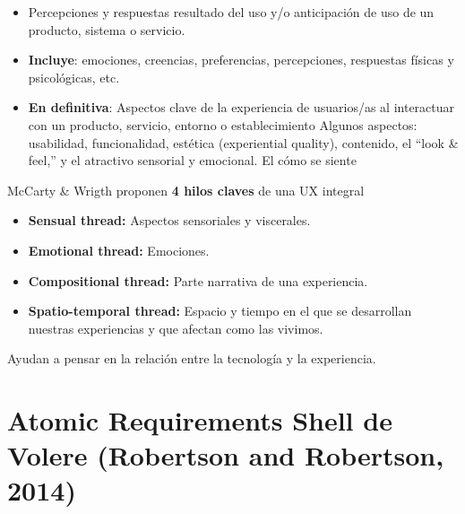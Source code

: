 \documentclass[12pt]{report} %
\begin{document}
\begin{itemize}

\item
  Percepciones y respuestas resultado del uso y/o anticipación de uso de
  un producto, sistema o servicio.
\item
\textbf{Incluye}: emociones, creencias, preferencias, percepciones, respuestas
  físicas y psicológicas, etc.
\item
\textbf{En definitiva}: Aspectos clave de la experiencia de usuarios/as al
  interactuar con un producto, servicio, entorno o establecimiento
  Algunos aspectos: usabilidad, funcionalidad, estética (experiential
  quality), contenido, el ``look \& feel,'' y el atractivo sensorial y
  emocional. El cómo se siente
\end{itemize}

McCarty \& Wrigth proponen \textbf{4 hilos claves} de una UX integral

\begin{itemize}

\item
\textbf{Sensual thread:} Aspectos sensoriales y viscerales.
\item
\textbf{Emotional thread:} Emociones.
\item
\textbf{Compositional thread:} Parte narrativa de una experiencia.
\item
\textbf{Spatio-temporal thread:} Espacio y tiempo en el que se desarrollan
  nuestras experiencias y que afectan como las vivimos.
\end{itemize}

Ayudan a pensar en la relación entre la tecnología y la experiencia.

\newpage

\section{Atomic Requirements Shell de Volere (Robertson and
Robertson, 2014)}
\end{document}
